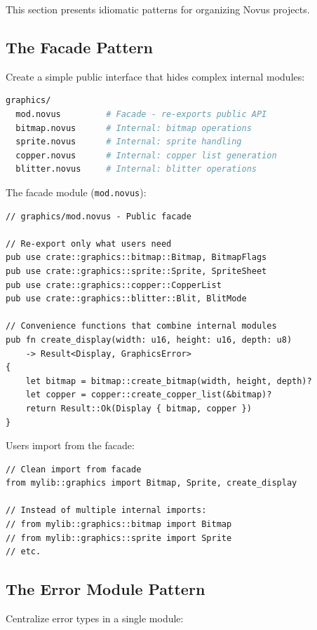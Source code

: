 This section presents idiomatic patterns for organizing Novus projects.

\subsection{The Facade Pattern}

Create a simple public interface that hides complex internal modules:

\begin{lstlisting}[language=bash]
graphics/
  mod.novus         # Facade - re-exports public API
  bitmap.novus      # Internal: bitmap operations
  sprite.novus      # Internal: sprite handling
  copper.novus      # Internal: copper list generation
  blitter.novus     # Internal: blitter operations
\end{lstlisting}

The facade module (\texttt{mod.novus}):

\begin{lstlisting}
// graphics/mod.novus - Public facade

// Re-export only what users need
pub use crate::graphics::bitmap::Bitmap, BitmapFlags
pub use crate::graphics::sprite::Sprite, SpriteSheet
pub use crate::graphics::copper::CopperList
pub use crate::graphics::blitter::Blit, BlitMode

// Convenience functions that combine internal modules
pub fn create_display(width: u16, height: u16, depth: u8)
    -> Result<Display, GraphicsError>
{
    let bitmap = bitmap::create_bitmap(width, height, depth)?
    let copper = copper::create_copper_list(&bitmap)?
    return Result::Ok(Display { bitmap, copper })
}
\end{lstlisting}

Users import from the facade:

\begin{lstlisting}
// Clean import from facade
from mylib::graphics import Bitmap, Sprite, create_display

// Instead of multiple internal imports:
// from mylib::graphics::bitmap import Bitmap
// from mylib::graphics::sprite import Sprite
// etc.
\end{lstlisting}

\subsection{The Error Module Pattern}

Centralize error types in a single module:

